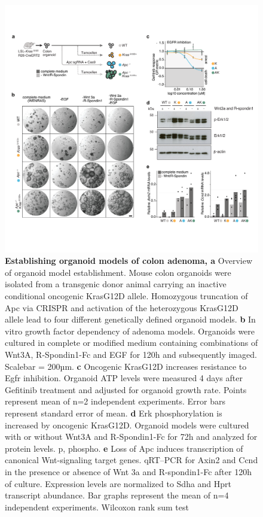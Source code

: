 \begin{flushleft}
\begin{figure}[H]
\centering
\includegraphics[width=\textwidth,
                height=\textheight,
                keepaspectratio]{figures/adenomaprofiling/pdf/fig_1_0.pdf}
\caption[Establishing organoid models of colon adenoma]{\textbf{Establishing organoid models of colon adenoma, a} Overview of organoid model establishment. Mouse colon organoids were isolated from a transgenic donor animal carrying an inactive conditional oncogenic KrasG12D allele. Homozygous truncation of Apc via CRISPR and activation of the heterozygous KrasG12D allele lead to four different genetically defined organoid models.
\textbf{b} In vitro growth factor dependency of adenoma models. Organoids were cultured in complete or modified medium containing combinations of Wnt3A, R-Spondin1-Fc and EGF for 120h and subsequently imaged. Scalebar = 200µm.
\textbf{c}	Oncogenic KrasG12D increases resistance to Egfr inhibition. Organoid ATP levels were measured 4 days after Gefitinib treatment and adjusted for organoid growth rate. Points represent mean of n=2 independent experiments. Error bars represent standard error of mean.
\textbf{d} Erk phosphorylation is increased by oncogenic KrasG12D. Organoid models were cultured with or without Wnt3A and R-Spondin1-Fc for 72h and analyzed for protein levels. p, phospho.   
\textbf{e}	Loss of Apc induces transcription of canonical Wnt-signaling target genes. qRT–PCR for Axin2 and Ccnd in the presence or absence of Wnt 3a and R-spondin1-Fc after 120h of culture. Expression levels are normalized to Sdha and Hprt transcript abundance. Bar graphs represent the mean of n=4 independent experiments. Wilcoxon rank sum test 
}
\label{fig_a10}
\end{figure}
\bigbreak


\end{flushleft}
